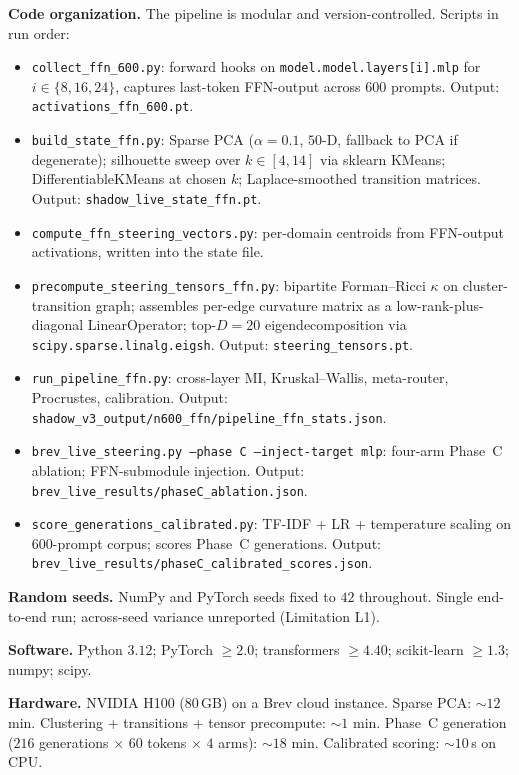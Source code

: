 \documentclass[10pt,twocolumn]{article}
\begin{document}
\textbf{Code organization.} The pipeline is modular and version-controlled. Scripts in run order:
\begin{itemize}\itemsep0pt
\item \texttt{collect\_ffn\_600.py}: forward hooks on \texttt{model.model.layers[i].mlp} for $i\in\{8,16,24\}$, captures last-token FFN-output across $600$ prompts. Output: \texttt{activations\_ffn\_600.pt}.
\item \texttt{build\_state\_ffn.py}: Sparse PCA ($\alpha{=}0.1$, $50$-D, fallback to PCA if degenerate); silhouette sweep over $k\in[4,14]$ via sklearn KMeans; DifferentiableKMeans at chosen $k$; Laplace-smoothed transition matrices. Output: \texttt{shadow\_live\_state\_ffn.pt}.
\item \texttt{compute\_ffn\_steering\_vectors.py}: per-domain centroids from FFN-output activations, written into the state file.
\item \texttt{precompute\_steering\_tensors\_ffn.py}: bipartite Forman--Ricci $\kappa$ on cluster-transition graph; assembles per-edge curvature matrix as a low-rank-plus-diagonal LinearOperator; top-$D{=}20$ eigendecomposition via \texttt{scipy.sparse.linalg.eigsh}. Output: \texttt{steering\_tensors.pt}.
\item \texttt{run\_pipeline\_ffn.py}: cross-layer MI, Kruskal--Wallis, meta-router, Procrustes, calibration. Output: \texttt{shadow\_v3\_output/n600\_ffn/pipeline\_ffn\_stats.json}.
\item \texttt{brev\_live\_steering.py --phase C --inject-target mlp}: four-arm Phase~C ablation; FFN-submodule injection. Output: \texttt{brev\_live\_results/phaseC\_ablation.json}.
\item \texttt{score\_generations\_calibrated.py}: TF-IDF + LR + temperature scaling on $600$-prompt corpus; scores Phase~C generations. Output: \texttt{brev\_live\_results/phaseC\_calibrated\_scores.json}.
\end{itemize}

\textbf{Random seeds.} NumPy and PyTorch seeds fixed to $42$ throughout. Single end-to-end run; across-seed variance unreported (Limitation L1).

\textbf{Software.} Python $3.12$; PyTorch $\geq 2.0$; transformers $\geq 4.40$; scikit-learn $\geq 1.3$; numpy; scipy.

\textbf{Hardware.} NVIDIA H100 (80\,GB) on a Brev cloud instance. Sparse PCA: $\sim 12$ min. Clustering + transitions + tensor precompute: $\sim 1$ min. Phase~C generation ($216$ generations $\times$ $60$ tokens $\times$ $4$ arms): $\sim 18$ min. Calibrated scoring: $\sim 10$\,s on CPU.
\end{document}
